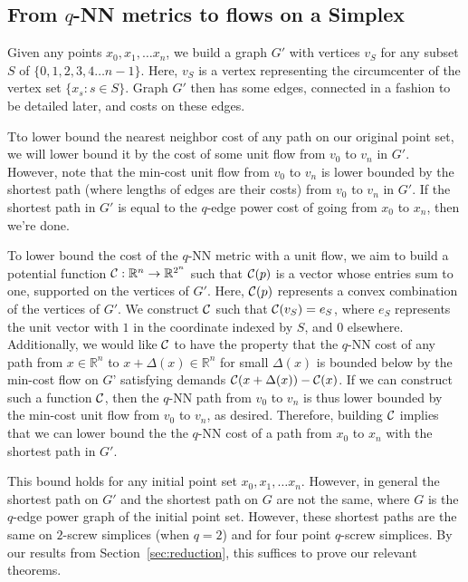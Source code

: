 \subsection{From $q$-NN metrics to flows on a Simplex}

Given any points $x_0, x_1, \ldots x_n$, we build a graph $G'$ with
vertices $v_S$ for any subset $S$ of
$\{0,1,2,3,4 \ldots n-1 \}$. Here, $v_S$ is a vertex representing the
circumcenter of the vertex set $\{x_s: s \in S\}$. Graph $G'$ then has some
edges, connected in a fashion to be detailed later, and costs on these edges.

Tto lower bound the nearest neighbor cost of any path on our original point
set, we will lower bound it by the cost of some unit flow from
$v_0$ to $v_n$ in $G'$. However, note that the min-cost
unit flow from $v_0$ to $v_n$ is lower bounded by the shortest path (where
lengths of edges are their costs) from $v_0$ to $v_n$ in $G'$.
If the shortest path in $G'$ is equal to the $q$-edge power cost of going
from $x_0$ to $x_n$, then we're done.

To lower bound the cost of the $q$-NN metric with a unit flow, we aim to build
a potential function $\mathcal{C}:\mathbb{R}^n \rightarrow \mathbb{R}^{2^n}$ such
that $\mathcal{C}(p)$ is a vector whose entries sum to one, supported on the
vertices of $G'$. Here, $\mathcal{C}(p)$
represents a convex combination of the vertices of $G'$. We construct $\mathcal{C}$
such that $\mathcal{C}(v_S) = e_S$, where $e_S$ represents the unit vector with $1$
in the coordinate indexed by $S$, and $0$ elsewhere. Additionally, we would
like $\mathcal{C}$ to have
the property that the $q$-NN cost of any path from $x \in \mathbb{R}^n$ to
$x+\Delta(x) \in \mathbb{R}^n$ for small $\Delta(x)$ is
bounded below by the min-cost flow on $G’$ satisfying demands
$\mathcal{C}(x+\Delta(x)) - \mathcal{C}(x)$. If we can construct such a function $\mathcal{C}$,
then the $q$-NN path from $v_0$ to $v_n$ is thus lower bounded by the min-cost
unit flow from $v_0$ to $v_n$, as desired.
 Therefore, building $\mathcal{C}$ implies that we can lower bound the
the $q$-NN cost of a path from $x_0$ to $x_n$ with the shortest path in $G'$.

This bound holds for any initial point set $x_0, x_1, \ldots x_n$. However,
in general the shortest path on $G'$ and the shortest path on $G$ are not
the same, where $G$ is the $q$-edge power graph of the initial point set.
However, these shortest paths are the same
on $2$-screw simplices (when $q=2$) and for four point $q$-screw
simplices. By our results from Section~\ref{sec:reduction}, this suffices
to prove our relevant theorems.

